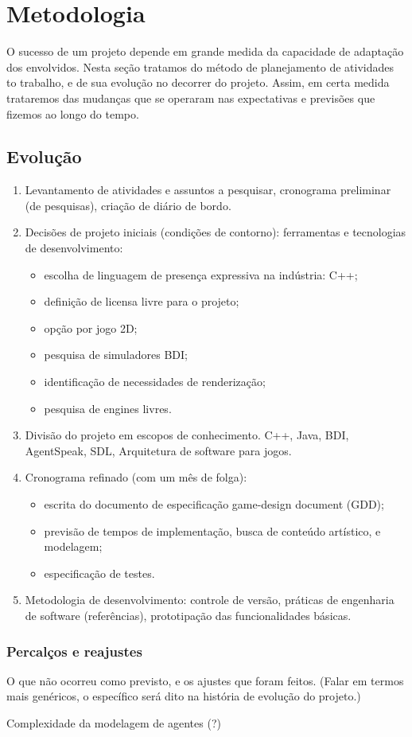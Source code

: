 \chapter{Metodologia}

O sucesso de um projeto depende em grande medida da capacidade de
adaptação dos envolvidos. Nesta seção tratamos do método de
planejamento de atividades to trabalho, e de sua evolução no decorrer
do projeto. Assim, em certa medida trataremos das mudanças que se
operaram nas expectativas e previsões que fizemos ao longo do tempo.

\section{Evolução}

\begin{enumerate}
\item Levantamento de atividades e assuntos a pesquisar, cronograma
  preliminar (de pesquisas), criação de diário de bordo.%

\item Decisões de projeto iniciais (condições de contorno): ferramentas e
tecnologias de desenvolvimento:
\begin{itemize}
\item  escolha de linguagem de presença expressiva na indústria: C++;
\item  definição de licensa livre para o projeto;
\item  opção por jogo 2D;
\item  pesquisa de simuladores BDI;
\item  identificação de necessidades de renderização;
\item  pesquisa de engines livres.
\end{itemize}%

\item Divisão do projeto em escopos de conhecimento. C++, Java, BDI,
AgentSpeak, SDL, Arquitetura de software para jogos.%

\item Cronograma refinado (com um mês de folga): 
\begin{itemize}
\item escrita do documento de especificação game-design document (GDD);
\item previsão de tempos de implementação, 
  busca de conteúdo artístico, e modelagem;
\item especificação de testes.
\end{itemize}%

\item Metodologia de desenvolvimento: controle de versão, práticas de
engenharia de software (referências), prototipação das funcionalidades básicas.
\end{enumerate}

\subsection{Percalços e reajustes}

O que não ocorreu como previsto, e os ajustes que foram feitos. (Falar
em termos mais genéricos, o específico será dito na história de
evolução do projeto.)

Complexidade da modelagem de agentes (?)

